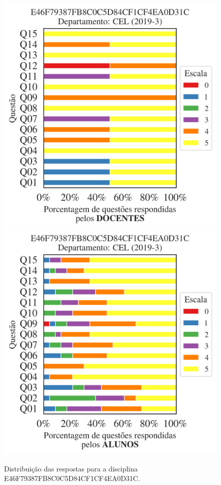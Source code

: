 \documentclass[a4paper,10pt]{article}
\begin{document}
\begin{figure}[h]
\centering
\includegraphics[width=0.485\linewidth]{analise_disciplina_departamento_CEL_E46F79387FB8C0C5D84CF1CF4EA0D31C_docentes.png}
\includegraphics[width=0.485\linewidth]{analise_disciplina_departamento_CEL_E46F79387FB8C0C5D84CF1CF4EA0D31C_alunos.png}
\caption{\label{fig:analise_geral_departamento}                Distribuição das respostas para a disciplina E46F79387FB8C0C5D84CF1CF4EA0D31C. }
\end{figure}
\end{document}
